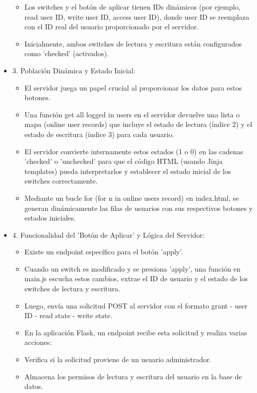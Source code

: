 \documentclass{report}
\begin{document}
\begin{itemize}
\begin{itemize}
\begin{itemize}
        \end{itemize}
        \item Los switches y el botón de aplicar tienen IDs dinámicos (por ejemplo, read user ID, write user ID, access user ID), donde user ID 
        se reemplaza con el ID real del usuario proporcionado por el servidor.
        \item Inicialmente, ambos switches de lectura y escritura están configurados como 'checked' (activados).
    \end{itemize}
    \item 3. Población Dinámica y Estado Inicial:
    \begin{itemize}
        \item El servidor juega un papel crucial al proporcionar los datos para estos botones.
        \item Una función get all logged in users en el servidor devuelve una lista o mapa (online user records) que incluye el estado de 
        lectura (índice 2) y el estado de escritura (índice 3) para cada usuario.
        \item El servidor convierte internamente estos estados (1 o 0) en las cadenas 'checked' o 'unchecked' para que el código HTML 
        (usando Jinja templates) pueda interpretarlos y establecer el estado inicial de los switches correctamente.
        \item Mediante un bucle for (for n in online users record) en index.html, se generan dinámicamente las filas de usuarios con sus 
        respectivos botones y estados iniciales.
    \end{itemize}
    \item 4. Funcionalidad del 'Botón de Aplicar' y Lógica del Servidor:
    \begin{itemize}
        \item Existe un endpoint específico para el botón 'apply'.
        \item Cuando un switch es modificado y se presiona 'apply', una función en main.js escucha estos cambios, extrae el ID de usuario y 
        el estado de los switches de lectura y escritura.
        \item Luego, envía una solicitud POST al servidor con el formato grant - user ID - read state - write state.
        \item En la aplicación Flask, un endpoint recibe esta solicitud y realiza varias acciones:
            \item Verifica si la solicitud proviene de un usuario administrador.
            \item Almacena los permisos de lectura y escritura del usuario en la base de datos.

\end{itemize}
\end{itemize}
\end{document}
